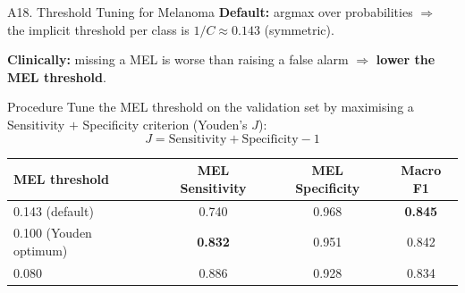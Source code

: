 \documentclass[10pt, aspectratio=169]{beamer}
\begin{document}
\begin{frame}{A18. Threshold Tuning for Melanoma}
    \footnotesize
    \textbf{Default:} argmax over probabilities $\Rightarrow$ the implicit threshold per class is $1/C \approx 0.143$ (symmetric).

    \textbf{Clinically:} missing a MEL is worse than raising a false alarm $\Rightarrow$ \textbf{lower the MEL threshold}.

    \vspace{0.2cm}
    \begin{block}{Procedure}
        \footnotesize Tune the MEL threshold on the validation set by maximising a Sensitivity $+$ Specificity criterion (Youden's $J$):
        \[
            J = \mathrm{Sensitivity} + \mathrm{Specificity} - 1
        \]
    \end{block}

    \begin{table}[]
        \scriptsize \centering
        \begin{tabular}{lccc}
        \toprule
        \rowcolor{usthblue!25} \textbf{MEL threshold} & \textbf{MEL Sensitivity} & \textbf{MEL Specificity} & \textbf{Macro F1} \\
        \midrule
        0.143 (default)            & 0.740 & 0.968 & \textbf{0.845} \\
        0.100 (Youden optimum)     & \textbf{0.832} & 0.951 & 0.842 \\
        0.080                      & 0.886 & 0.928 & 0.834 \\
        \bottomrule
        \end{tabular}
    \end{table}

\end{frame}
\end{document}
